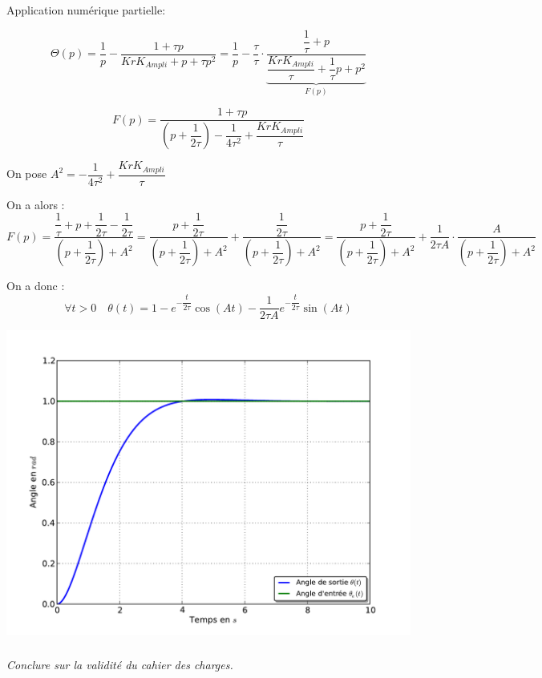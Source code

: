 \documentclass[11pt,oneside]{article}
\begin{document}
{\begin{corrige}
Application numérique partielle:

$$
\Theta(p)
= \dfrac{1}{p} -  \dfrac{1+ \tau p}{ KrK_{Ampli}   + p +\tau p^2 }
= \dfrac{1}{p} - \dfrac{\tau}{\tau}\cdot \underbrace{ \dfrac{\dfrac{1}{\tau}+ p}{ \dfrac{KrK_{Ampli}}{\tau}   + \dfrac{1}{\tau}p + p^2 }}_{F(p)}
$$

$$
F(p) = \dfrac{1+ \tau p}{ \left( p + \dfrac{1}{2\tau} \right)-\dfrac{1}{4\tau^2}+\dfrac{KrK_{Ampli}}{\tau}}
$$

On pose $A^2 = -\dfrac{1}{4\tau^2}+\dfrac{KrK_{Ampli}}{\tau}$

On a alors : 
$$
F(p) = \dfrac{\dfrac{1}{\tau}+ p+ \dfrac{1}{2\tau} -  \dfrac{1}{2\tau}}{ \left( p + \dfrac{1}{2\tau} \right)+A^2}
 = \dfrac{ p+ \dfrac{1}{2\tau}}{ \left( p + \dfrac{1}{2\tau} \right)+A^2}+\dfrac{\dfrac{1}{2\tau}}{ \left( p + \dfrac{1}{2\tau} \right)+A^2}
 = \dfrac{ p+ \dfrac{1}{2\tau}}{ \left( p + \dfrac{1}{2\tau} \right)+A^2}+\dfrac{1}{2\tau A}\cdot \dfrac{A}{ \left( p + \dfrac{1}{2\tau} \right)+A^2}
$$


On a donc : 
$$
\forall t>0 \quad \theta(t) =1 - e^{ - \dfrac{t}{2\tau}} \cos\left( At\right)- \dfrac{1}{2\tau A}e^{ - \dfrac{t}{2\tau}}\sin\left( At\right)
$$
\end{corrige}

\begin{center}
\includegraphics[width=.75\linewidth]{png/figure_2.pdf}
\end{center}
}{}


\subparagraph{}
\textit{Conclure sur la validité du cahier des charges.}

\end{document}
